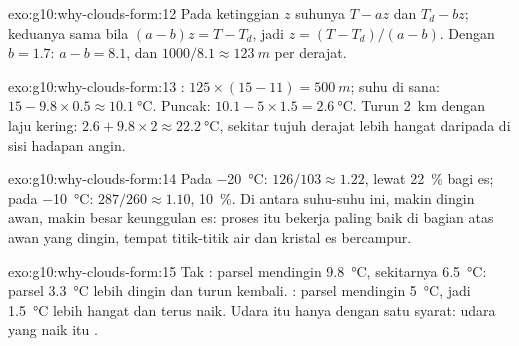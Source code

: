 \begin{solution}{exo:g10:why-clouds-form:12}
Pada ketinggian $z$ suhunya $T - a z$ dan  $T_d - b z$;
keduanya sama bila $(a - b) z = T - T_d$, jadi $z = (T - T_d)/(a - b)$. Dengan
$b = 1.7$: $a - b = 8.1$, dan $1000/8.1 \approx \qty{123}{m}$ per derajat.
\end{solution}

\begin{solution}{exo:g10:why-clouds-form:13}
: $125 \times (15 - 11) = \qty{500}{m}$; suhu di sana:
$15 - 9.8 \times 0.5 \approx \qty{10.1}{\degreeCelsius}$. Puncak: $10.1 - 5
\times 1.5 = \qty{2.6}{\degreeCelsius}$. Turun \qty{2}{km} dengan laju kering:
$2.6 + 9.8 \times 2 \approx \qty{22.2}{\degreeCelsius}$, sekitar tujuh derajat
lebih hangat daripada di sisi hadapan angin.
\end{solution}

\begin{solution}{exo:g10:why-clouds-form:14}
Pada \qty{-20}{\degreeCelsius}: $126/103 \approx 1.22$, lewat 
\qty{22}{\percent} bagi es; pada \qty{-10}{\degreeCelsius}: $287/260 \approx
1.10$, \qty{10}{\percent}. Di antara suhu-suhu ini, makin dingin awan, makin
besar keunggulan es: proses itu bekerja paling baik di bagian atas awan yang
dingin, tempat titik-titik air dan kristal es bercampur.
\end{solution}

\begin{solution}{exo:g10:why-clouds-form:15}
Tak : parsel mendingin \qty{9.8}{\degreeCelsius}, sekitarnya
\qty{6.5}{\degreeCelsius}: parsel \qty{3.3}{\degreeCelsius} lebih dingin dan
turun kembali. : parsel mendingin \qty{5}{\degreeCelsius}, jadi
\qty{1.5}{\degreeCelsius} lebih hangat dan terus naik. Udara itu 
hanya dengan satu syarat: udara yang naik itu .
\end{solution}

